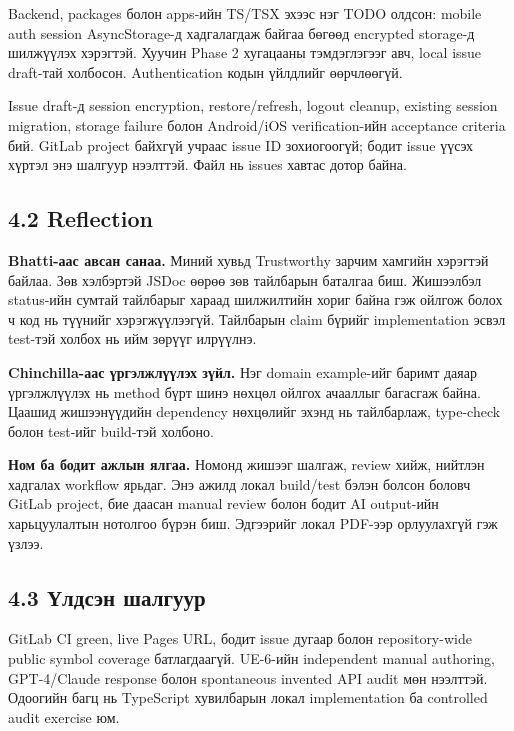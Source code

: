 \documentclass[
  mongolian,
]{article}
\begin{document}
Backend, packages болон apps-ийн TS/TSX эхээс нэг TODO олдсон: mobile
auth session AsyncStorage-д хадгалагдаж байгаа бөгөөд encrypted
storage-д шилжүүлэх хэрэгтэй. Хуучин Phase 2 хугацааны тэмдэглэгээг авч,
local issue draft-тай холбосон. Authentication кодын үйлдлийг
өөрчлөөгүй.

Issue draft-д session encryption, restore/refresh, logout cleanup,
existing session migration, storage failure болон Android/iOS
verification-ийн acceptance criteria бий. GitLab project байхгүй учраас
issue ID зохиогоогүй; бодит issue үүсэх хүртэл энэ шалгуур нээлттэй.
Файл нь issues хавтас дотор байна.

\subsection{4.2 Reflection}\label{reflection}

\textbf{Bhatti-аас авсан санаа.} Миний хувьд Trustworthy зарчим хамгийн
хэрэгтэй байлаа. Зөв хэлбэртэй JSDoc өөрөө зөв тайлбарын баталгаа биш.
Жишээлбэл status-ийн сумтай тайлбарыг хараад шилжилтийн хориг байна гэж
ойлгож болох ч код нь түүнийг хэрэгжүүлээгүй. Тайлбарын claim бүрийг
implementation эсвэл test-тэй холбох нь ийм зөрүүг илрүүлнэ.

\textbf{Chinchilla-аас үргэлжлүүлэх зүйл.} Нэг domain example-ийг баримт
даяар үргэлжлүүлэх нь method бүрт шинэ нөхцөл ойлгох ачааллыг багасгаж
байна. Цаашид жишээнүүдийн dependency нөхцөлийг эхэнд нь тайлбарлаж,
type-check болон test-ийг build-тэй холбоно.

\textbf{Ном ба бодит ажлын ялгаа.} Номонд жишээг шалгаж, review хийж,
нийтлэн хадгалах workflow ярьдаг. Энэ ажилд локал build/test бэлэн
болсон боловч GitLab project, бие даасан manual review болон бодит AI
output-ийн харьцуулалтын нотолгоо бүрэн биш. Эдгээрийг локал PDF-ээр
орлуулахгүй гэж үзлээ.

\subsection{4.3 Үлдсэн
шалгуур}\label{ux4afux43bux434ux441ux44dux43d-ux448ux430ux43bux433ux443ux443ux440}

GitLab CI green, live Pages URL, бодит issue дугаар болон
repository-wide public symbol coverage батлагдаагүй. UE-6-ийн
independent manual authoring, GPT-4/Claude response болон spontaneous
invented API audit мөн нээлттэй. Одоогийн багц нь TypeScript хувилбарын
локал implementation ба controlled audit exercise юм.
\end{document}
